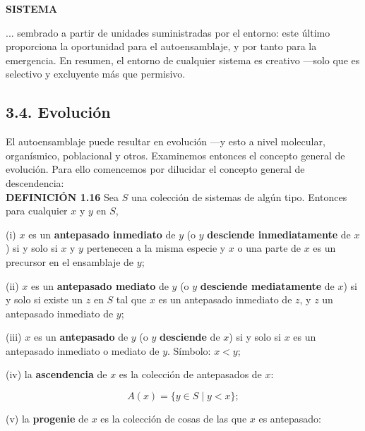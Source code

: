 \newpage
\fancyhf{}
\fancyhead[r]{\thepage}
\begin{center}
{\fontsize{13}{16}\selectfont \textbf{SISTEMA}}
\end{center}
\vspace{0.5cm}

{\fontsize{13}{15}\selectfont
... sembrado a partir de unidades suministradas por el entorno: este último proporciona la oportunidad para el autoensamblaje, y por tanto para la emergencia. En resumen, el entorno de cualquier sistema es creativo —solo que es selectivo y excluyente más que permisivo.

\subsection*{3.4. Evolución}

El autoensamblaje puede resultar en evolución —y esto a nivel molecular, organísmico, poblacional y otros. 
Examinemos entonces el concepto general de evolución. Para ello comencemos por dilucidar el concepto general de descendencia: \\

\textbf{DEFINICIÓN 1.16} Sea \( S \) una colección de sistemas de algún tipo. Entonces para cualquier \( x \) y \( y \) en \( S \),

(i) \( x \) es un \textbf{antepasado inmediato} de \( y \) (o \( y \) \textbf{desciende inmediatamente} de \( x \)) si y solo si \( x \) y \( y \) pertenecen a la misma especie y \( x \) o una parte de \( x \) es un precursor en el ensamblaje de \( y \);

(ii) \( x \) es un \textbf{antepasado mediato} de \( y \) (o \( y \) \textbf{desciende mediatamente} de \( x \)) si y solo si existe un \( z \) en \( S \) tal que \( x \) es un antepasado inmediato de \( z \), y \( z \) un antepasado inmediato de \( y \);

(iii) \( x \) es un \textbf{antepasado} de \( y \) (o \( y \) \textbf{desciende} de \( x \)) si y solo si \( x \) es un antepasado inmediato o mediato de \( y \). Símbolo: \( x < y \);

(iv) la \textbf{ascendencia} de \( x \) es la colección de antepasados de \( x \):

\[A(x) = \{y \in S \mid y < x\};\]

(v) la \textbf{progenie} de \( x \) es la colección de cosas de las que \( x \) es antepasado:

}
